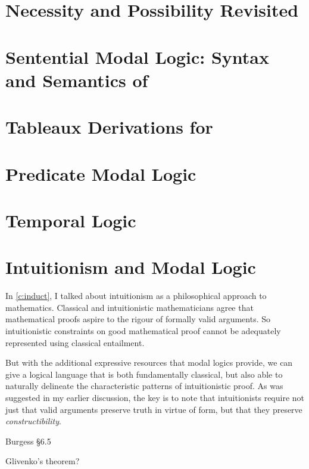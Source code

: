 
\section{Necessity and Possibility Revisited}

\section[Sentential Modal Logic]{Sentential Modal Logic: Syntax and Semantics of \sml}

\section{Tableaux Derivations for \sml}

\section{Predicate Modal Logic}

\section{Temporal Logic}

\section{Intuitionism and Modal Logic}

In \autoref{c:induct}, I talked about intuitionism as a philosophical approach to mathematics. Classical and intuitionistic mathematicians agree that mathematical proofs aspire to the rigour of formally valid arguments. So intuitionistic constraints on good mathematical proof cannot be adequately represented using classical entailment.

But with the additional expressive resources that modal logics provide, we can give a logical language that is both fundamentally classical, but also able to naturally delineate the characteristic patterns of intuitionistic proof. As was suggested in my earlier discussion, the key is to note that intuitionists require not just that valid arguments preserve truth in virtue of form, but that they preserve \emph{constructibility}.

Burgess §6.5

Glivenko's theorem? 

